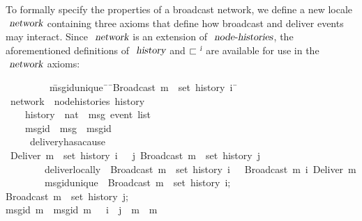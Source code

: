 To formally specify the properties of a broadcast network, we define a new locale $\isa{network}$ containing three axioms that define how broadcast and deliver events may interact.
Since $\isa{network}$ is an extension of $\isa{node-histories}$, the aforementioned definitions of $\isa{history}$ and $\sqsubset^\isa{i}$ are available for use in the $\isa{network}$ axioms:
\begin{isabelle}
~~~~~~~~\ \=msg{\isacharunderscore}id{\isacharunderscore}unique{\isacharcolon}\ \={\isasymrbrakk}\ \={\isachardoublequoteopen}Broadcast\ m\ {\isasymin}\ set\ {\isacharparenleft}history\ i{\isacharparenright}\ \=\kill
{}\ network\ {\isacharequal}\ node{\isacharunderscore}histories\ history\\
~~~~\>history\ {\isacharcolon}{\isacharcolon}\ {\isachardoublequoteopen}nat\ {\isasymRightarrow}\ {\isacharprime}msg\ event\ list{\isachardoublequoteclose}\ {\isacharplus}\\
~~~~\>msg{\isacharunderscore}id\ {\isacharcolon}{\isacharcolon}\ {\isachardoublequoteopen}{\isacharprime}msg\ {\isasymRightarrow}\ {\isacharprime}msgid{\isachardoublequoteclose}\\
~~~~\ delivery{\isacharunderscore}has{\isacharunderscore}a{\isacharunderscore}cause{\isacharcolon}\\
\>\>{\isasymlbrakk}\ {\isachardoublequoteopen}Deliver\ m\ {\isasymin}\ set\ {\isacharparenleft}history\ i{\isacharparenright}\ \>\>{\isasymrbrakk}\ {\isasymLongrightarrow}\ {\isasymexists}j{\isachardot}\ Broadcast\ m\ {\isasymin}\ set\ {\isacharparenleft}history\ j{\isacharparenright}{\isachardoublequoteclose}\\
~~~~~~~~\>deliver{\isacharunderscore}locally{\isacharcolon}\ \>{\isasymlbrakk}\ \>{\isachardoublequoteopen}Broadcast\ m\ {\isasymin}\ set\ {\isacharparenleft}history\ i{\isacharparenright}\ \>{\isasymrbrakk}\ {\isasymLongrightarrow}\  Broadcast\ m\ {\isasymsqsubset}\isactrlsup i\ Deliver\ m{\isachardoublequoteclose}\\
~~~~~~~~\>msg{\isacharunderscore}id{\isacharunderscore}unique{\isacharcolon}\ \>{\isasymlbrakk}\ \>{\isachardoublequoteopen}Broadcast\ m{}\ {\isasymin}\ set\ {\isacharparenleft}history\ i{\isacharparenright};\\
\>\>\>Broadcast\ m{}\ {\isasymin}\ set\ {\isacharparenleft}history\ j{\isacharparenright};\\
\>\>\>msg{\isacharunderscore}id\ m{}\ {\isacharequal}\ msg{\isacharunderscore}id\ m{}\ \>{\isasymrbrakk}\ {\isasymLongrightarrow}\ i\ {\isacharequal}\ j\ {\isasymand}\ m{}\ {\isacharequal}\ m{}{\isachardoublequoteclose}
\end{isabelle}
